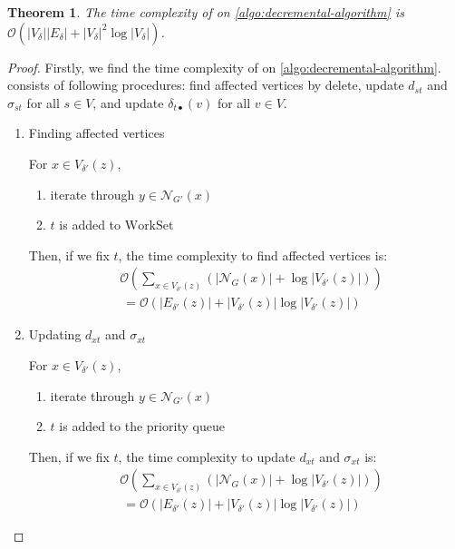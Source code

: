 \documentclass[twocolumn]{article}
\newtheorem{theorem}{Theorem}
\begin{document}
  \begin{theorem}
    \label{tm:time-complexity}
    The time complexity of  on \ref{algo:decremental-algorithm} is
    $\mathcal{O}(\lvert V_\delta\rvert\lvert E_\delta\rvert+\lvert V_\delta\rvert^2\log \lvert V_\delta\rvert)$.
  \end{theorem}
  \begin{proof}
    Firstly, we find the time complexity of  on \ref{algo:decremental-algorithm}.
     consists of following procedures: find affected vertices by delete, update $d_{st}$ and $\sigma_{st}$ for all $s\in V$, and update $\delta_{t\bullet}(v)$ for all $v\in V$.
    
    \begin{enumerate}[label=(\alph*)]
    \item Finding affected vertices
      \par For $x\in V_{\delta'}(z)$,
      \begin{enumerate}[label=\arabic*.]
      \item iterate through $y\in\mathcal{N}_{G'}(x)$
      \item $t$ is added to $\text{WorkSet}$
      \end{enumerate}
      Then, if we fix $t$, the time complexity to find affected vertices is:
      \begin{equation}
        \begin{aligned}
          &\mathcal{O}(\sum_{x\in V_{\delta'}(z)}(\lvert\mathcal{N}_G(x)\rvert
          +\log\lvert V_{\delta'}(z)\rvert)) \nonumber\\
          &\:=\mathcal{O}(\lvert E_{\delta'}(z)\rvert
          +\lvert V_{\delta'}(z)\rvert\log\lvert V_{\delta'}(z)\rvert) \nonumber
        \end{aligned}
      \end{equation}

    \item Updating $d_{xt}$ and $\sigma_{xt}$
      \par For $x\in V_{\delta'}(z)$,
      \begin{enumerate}[label=\arabic*.]
      \item iterate through $y\in\mathcal{N}_{G'}(x)$
      \item $t$ is added to the priority queue
      \end{enumerate}
      Then, if we fix $t$, the time complexity to update $d_{xt}$ and $\sigma_{xt}$ is:
      \begin{equation}
        \begin{aligned}
          &\mathcal{O}(\sum_{x\in V_{\delta'}(z)}(\lvert\mathcal{N}_G(x)\rvert
          +\log\lvert V_{\delta'}(z)\rvert)) \nonumber\\
          &\:=\mathcal{O}(\lvert E_{\delta'}(z)\rvert
          +\lvert V_{\delta'}(z)\rvert\log\lvert V_{\delta'}(z)\rvert) \nonumber
        \end{aligned}
      \end{equation}
      

\end{enumerate}
\end{proof}
\end{document}
